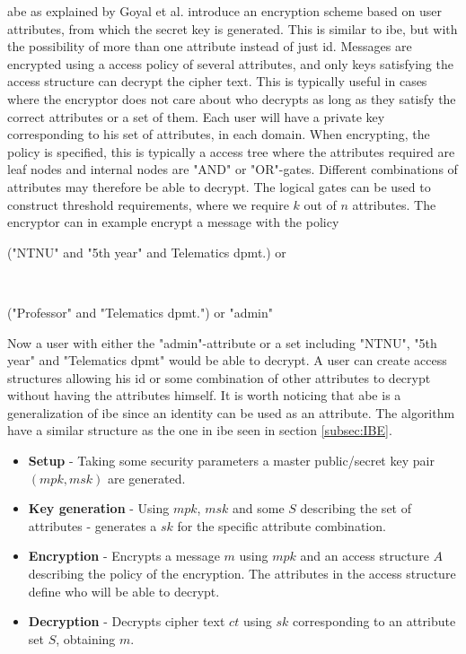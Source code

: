 \Glsdesc{abe} as explained by Goyal et al. \cite{ABE} introduce an encryption scheme based on user attributes, from which the secret key is generated. This is similar to \gls{ibe}, but with the possibility of more than one attribute instead of just id. Messages are encrypted using a access policy of several attributes, and only keys satisfying the access structure can decrypt the cipher text. This is typically useful in cases where the encryptor does not care about who decrypts as long as they satisfy the correct attributes or a set of them. Each user will have a private key corresponding to his set of attributes, in each domain. When encrypting, the policy is specified, this is typically a access tree where the attributes required are leaf nodes and internal nodes are "AND" or "OR"-gates. Different combinations of attributes may therefore be able to decrypt. The logical gates can be used to construct threshold requirements, where we require $k$ out of $n$ attributes. The encryptor can in example encrypt a message with the policy\\ \centerline{("NTNU" and "5th year" and Telematics dpmt.) or} \\ \centerline{("Professor" and "Telematics dpmt.") or "admin"}
Now a user with either the "admin"-attribute or a set including "NTNU", "5th year" and "Telematics dpmt" would be able to decrypt. A user can create access structures allowing his id or some combination of other attributes to decrypt without having the attributes himself. It is worth noticing that \gls{abe} is a generalization of \gls{ibe} since an identity can be used as an attribute. The algorithm  have a similar structure as the one in \gls{ibe} seen in section \ref{subsec:IBE}.

\begin{itemize}
\item \textbf{ Setup } - Taking some security parameters a master public/secret key pair $(mpk, msk)$ are generated.
\item \textbf{ Key generation } - Using $mpk$, $msk$ and some $S$ describing the set of attributes - generates a $sk$ for the specific attribute combination. 
\item \textbf{ Encryption } - Encrypts a message $m$ using $mpk$ and an access structure $A$ describing the policy of the encryption. The attributes in the access structure define who will be able to decrypt. 
\item \textbf{ Decryption } - Decrypts cipher text $ct$ using $sk$ corresponding to an attribute set $S$, obtaining $m$. 
\end{itemize}



